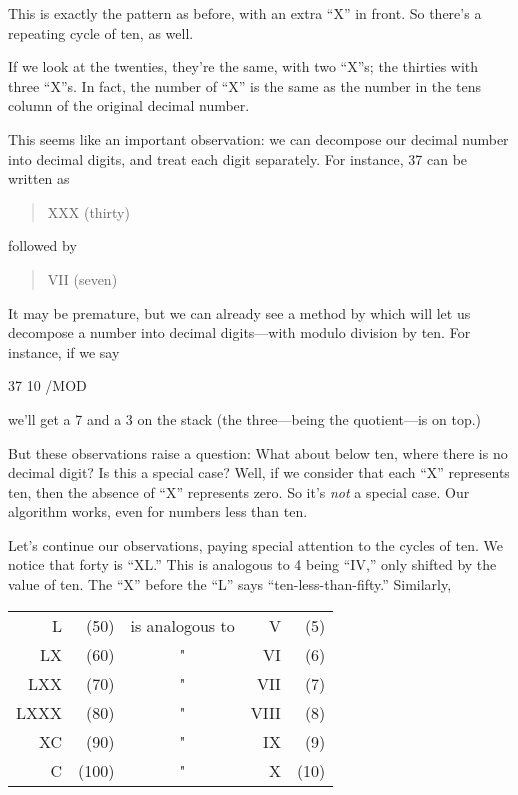 \medskip
\noindent This is exactly the pattern as before, with an extra ``X''
in front. So there's a repeating cycle of ten, as well.

If we look at the twenties, they're the same, with two ``X''s; the
thirties with three ``X''s. In fact, the number of ``X'' is the same as the
number in the tens column of the original decimal number.

This seems like an important observation: we can decompose our decimal
number into decimal digits, and treat each digit separately. For instance,
37 can be written as

\begin{quote}
{\sf XXX (thirty)}
\end{quote}

\noindent followed by

\begin{quote}
{\sf VII (seven)}
\end{quote}

\noindent It may be premature, but we can already see a method by
which \Forth{} will let us decompose a number into decimal digits---with
modulo division by ten. For instance, if we say

\begin{Code}
37 10 /MOD
\end{Code}
we'll get a 7 and a 3 on the stack (the three---being the quotient---is on
top.)

But these observations raise a question: What about below ten, where there
is no decimal digit? Is this a special case? Well, if we consider that
each ``X'' represents ten, then the absence of ``X'' represents zero.  So
it's \emph{not} a special case. Our algorithm works, even for numbers less
than ten.

Let's continue our observations, paying special attention to the
cycles of ten. We notice that forty is ``XL.'' This is analogous to 4 being
``IV,'' only shifted by the value of ten. The ``X'' before the ``L'' says
``ten-less-than-fifty.'' Similarly,

\bigskip
{\sf\begin{tabular}{rrcrr}
   L &  (50) &   is analogous to &     V & (5) \\
  LX &  (60) &          "        &    VI & (6) \\
 LXX &  (70) &          "        &   VII & (7) \\
LXXX &  (80) &          "        &  VIII & (8) \\
  XC &  (90) &          "        &    IX & (9) \\
   C & (100) &          "        &     X & (10) \\
\end{tabular}}
\bigskip

